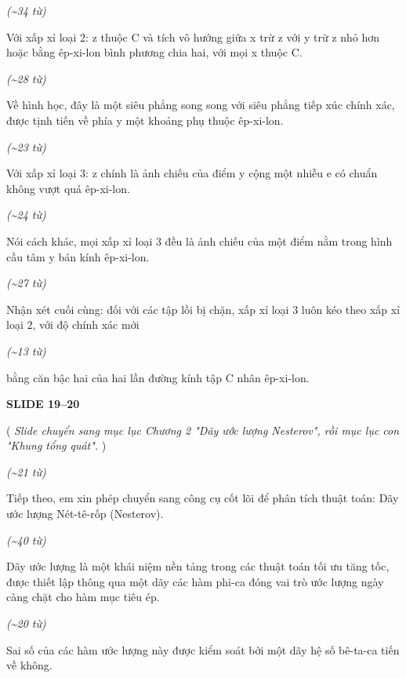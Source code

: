 ﻿\documentclass[12pt]{article}
\newcommand{\scene}[1]{
    \vspace{18pt}
    \normalsize
    \noindent\textbf{\MakeUppercase{#1}}
    \vspace{12pt}
}
\newcommand{\action}[1]{
    \vspace{6pt}
    \small
    \noindent(\textit{#1})
    \vspace{6pt}
}
\newenvironment{speech}{
    \normalsize
    \begin{list}{}{
        \leftmargin=1.25in
        \rightmargin=1.25in
        \parsep=0pt
        \topsep=0pt
        \partopsep=0pt
    }
    \item[]
}{
    \end{list}
    \vspace{6pt}
}
\newcommand{\block}[1]{
    \vspace{4pt}
    \noindent\hspace{1.5in}\textit{(\textasciitilde #1 từ)}
}
\begin{document}
\block{34}
\begin{speech}
    Với xấp xỉ loại 2: z thuộc C và tích vô hướng giữa x trừ z với y trừ z nhỏ hơn hoặc bằng êp-xi-lon bình phương chia hai, với mọi x thuộc C.
\end{speech}

\block{28}
\begin{speech}
    Về hình học, đây là một siêu phẳng song song với siêu phẳng tiếp xúc chính xác, được tịnh tiến về phía y một khoảng phụ thuộc êp-xi-lon.
\end{speech}

\block{23}
\begin{speech}
    Với xấp xỉ loại 3: z chính là ảnh chiếu của điểm y cộng một nhiễu e có chuẩn không vượt quá êp-xi-lon.
\end{speech}

\block{24}
\begin{speech}
    Nói cách khác, mọi xấp xỉ loại 3 đều là ảnh chiếu của một điểm nằm trong hình cầu tâm y bán kính êp-xi-lon.
\end{speech}

\block{27}
\begin{speech}
    Nhận xét cuối cùng: đối với các tập lồi bị chặn, xấp xỉ loại 3 luôn kéo theo xấp xỉ loại 2, với độ chính xác mới
\end{speech}

\block{13}
\begin{speech}
    bằng căn bậc hai của hai lần đường kính tập C nhân êp-xi-lon.
\end{speech}

\scene{SLIDE 19--20}

\action{
    Slide chuyển sang mục lục Chương 2 "Dãy ước lượng Nesterov", rồi mục lục con "Khung tổng quát".
}

\block{21}
\begin{speech}
    Tiếp theo, em xin phép chuyển sang công cụ cốt lõi để phân tích thuật toán: Dãy ước lượng Nét-tê-rốp (Nesterov).
\end{speech}

\block{40}
\begin{speech}
    Dãy ước lượng là một khái niệm nền tảng trong các thuật toán tối ưu tăng tốc, được thiết lập thông qua một dãy các hàm phi-ca đóng vai trò ước lượng ngày càng chặt cho hàm mục tiêu ép.
\end{speech}

\block{20}
\begin{speech}
    Sai số của các hàm ước lượng này được kiểm soát bởi một dãy hệ số bê-ta-ca tiến về không.
\end{speech}
\end{document}
